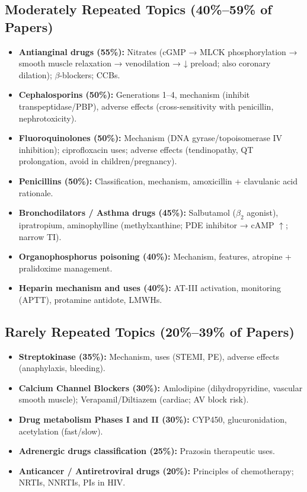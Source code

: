 \documentclass[11pt,a4paper]{article}
\begin{document}
\subsection{Moderately Repeated Topics (40\%--59\% of Papers)}
\begin{itemize}[leftmargin=*]
    \item \textbf{Antianginal drugs (55\%):} Nitrates (cGMP → MLCK phosphorylation → smooth muscle relaxation → venodilation → ↓ preload; also coronary dilation); $\beta$-blockers; CCBs.
    \item \textbf{Cephalosporins (50\%):} Generations 1--4, mechanism (inhibit transpeptidase/PBP), adverse effects (cross-sensitivity with penicillin, nephrotoxicity).
    \item \textbf{Fluoroquinolones (50\%):} Mechanism (DNA gyrase/topoisomerase IV inhibition); ciprofloxacin uses; adverse effects (tendinopathy, QT prolongation, avoid in children/pregnancy).
    \item \textbf{Penicillins (50\%):} Classification, mechanism, amoxicillin + clavulanic acid rationale.
    \item \textbf{Bronchodilators / Asthma drugs (45\%):} Salbutamol ($\beta_2$ agonist), ipratropium, aminophylline (methylxanthine; PDE inhibitor → cAMP $\uparrow$; narrow TI).
    \item \textbf{Organophosphorus poisoning (40\%):} Mechanism, features, atropine + pralidoxime management.
    \item \textbf{Heparin mechanism and uses (40\%):} AT-III activation, monitoring (APTT), protamine antidote, LMWHs.
\end{itemize}

\subsection{Rarely Repeated Topics (20\%--39\% of Papers)}
\begin{itemize}[leftmargin=*]
    \item \textbf{Streptokinase (35\%):} Mechanism, uses (STEMI, PE), adverse effects (anaphylaxis, bleeding).
    \item \textbf{Calcium Channel Blockers (30\%):} Amlodipine (dihydropyridine, vascular smooth muscle); Verapamil/Diltiazem (cardiac; AV block risk).
    \item \textbf{Drug metabolism Phases I and II (30\%):} CYP450, glucuronidation, acetylation (fast/slow).
    \item \textbf{Adrenergic drugs classification (25\%):} Prazosin therapeutic uses.
    \item \textbf{Anticancer / Antiretroviral drugs (20\%):} Principles of chemotherapy; NRTIs, NNRTIs, PIs in HIV.
\end{itemize}
\end{document}
